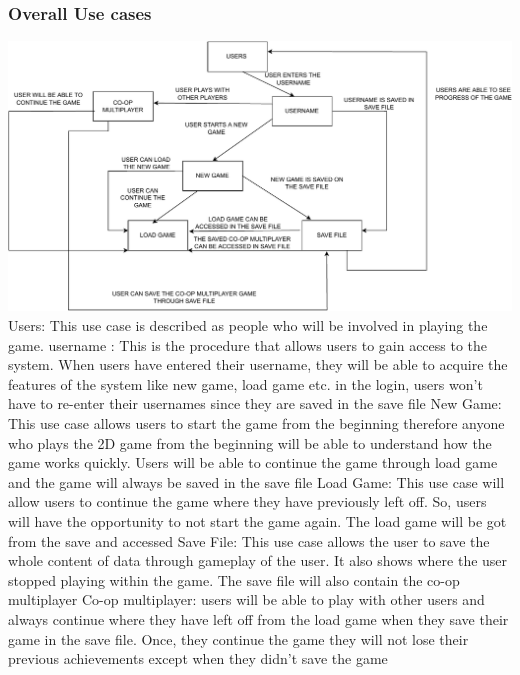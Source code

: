 \documentclass{article}
\begin{document}
\subsubsection{Overall Use cases}
\includegraphics[scale=0.5,page=1]{2DGAME (1)-crop.pdf} \\
Users: This use case is described as people who will be involved in playing the game.
username : This is the procedure that allows users to gain access to the system. When users have entered their username, they will be able to acquire the features of the system like new game, load game etc. in the login, users won't have to re-enter their usernames since they are saved in the save file
New Game: This use case allows users to start the game from the beginning therefore anyone who plays the 2D game from the beginning will be able to understand how the game works quickly. Users will be able to continue the game through load game and the game will always  be saved in the save file
Load Game: This use case will allow users to continue the game where they have previously left off. So, users will have the opportunity to not start the game again. The load game will be got from the save and accessed
Save File: This use case allows the user to save the whole content of data through gameplay of the user. It also shows where the user stopped playing within the game. The save file will also contain the co-op multiplayer
Co-op multiplayer: users will be able to play with other users and always continue where they have left off from the load game when they save their game in the save file. Once, they continue the game they will not lose their previous achievements except when they didn’t save the game
\end{document}
